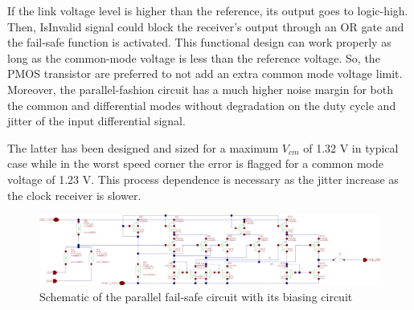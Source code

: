 If the link voltage level is higher than the reference, its output goes to logic-high. Then, IsInvalid signal could block the receiver's output through an OR gate and the fail-safe function is activated. This functional design can work properly as long as the common-mode voltage is less than the reference voltage. So, the PMOS transistor are preferred to not add an extra common mode voltage limit. Moreover, the parallel-fashion circuit has a much higher noise margin for both the common and differential modes without degradation on the duty cycle and jitter of the input differential signal.

The latter has been designed and sized for a maximum $V_{cm}$ of 1.32 V in typical case while in the worst speed corner the error is flagged for a common mode voltage of 1.23 V. This process dependence is necessary as the jitter increase as the clock receiver is slower.

\begin{figure}[htp]
    \centering
    \includegraphics[width=\textwidth]{Chapter5/Figs/adc_chip/lvds-failsafe.png}
    \caption{Schematic of the parallel fail-safe circuit with its biasing circuit}
    \label{}
\end{figure}

